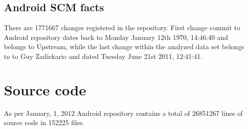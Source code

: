 \documentclass[a4paper,10pt]{article}
\numberwithin{equation}{subsection}
\begin{document}
\subsection{Android SCM facts}
There are 1771667 changes registered in the repository. First change commit to Android repository dates back 
to Monday January 12th 1970, 14:46:40 and belongs to Upstream, while the last change
within the analyzed data set belongs to to Guy Zadickario and dated 
Tuesday June 21st 2011, 12:41:41.


\section{Source code}
As per January, 1, 2012 Android repository contains a total of 26851267 lines of source code in 
152225 files. 
\end{document}
